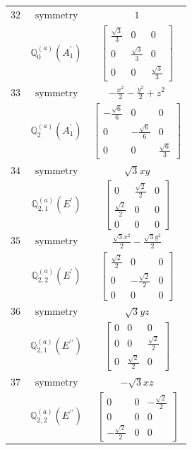 \documentclass[fleqn,8pt,landscape]{jsarticle}
\begin{document}
\begin{longtable}{ccc}
$ 32 $ & $ \text{symmetry} $ & $ 1 $ \\
$  $ & $ \mathbb{Q}_{0}^{(a)}(A_{1}^{\prime}) $ & $ \begin{bmatrix} \frac{\sqrt{3}}{3} & 0 & 0 \\ 0 & \frac{\sqrt{3}}{3} & 0 \\ 0 & 0 & \frac{\sqrt{3}}{3} \end{bmatrix} $ \\ \hline
$ 33 $ & $ \text{symmetry} $ & $ - \frac{x^{2}}{2} - \frac{y^{2}}{2} + z^{2} $ \\
$  $ & $ \mathbb{Q}_{2}^{(a)}(A_{1}^{\prime}) $ & $ \begin{bmatrix} - \frac{\sqrt{6}}{6} & 0 & 0 \\ 0 & - \frac{\sqrt{6}}{6} & 0 \\ 0 & 0 & \frac{\sqrt{6}}{3} \end{bmatrix} $ \\ \hline
$ 34 $ & $ \text{symmetry} $ & $ \sqrt{3} x y $ \\
$  $ & $ \mathbb{Q}_{2,1}^{(a)}(E^{\prime}) $ & $ \begin{bmatrix} 0 & \frac{\sqrt{2}}{2} & 0 \\ \frac{\sqrt{2}}{2} & 0 & 0 \\ 0 & 0 & 0 \end{bmatrix} $ \\ \hline
$ 35 $ & $ \text{symmetry} $ & $ \frac{\sqrt{3} x^{2}}{2} - \frac{\sqrt{3} y^{2}}{2} $ \\
$  $ & $ \mathbb{Q}_{2,2}^{(a)}(E^{\prime}) $ & $ \begin{bmatrix} \frac{\sqrt{2}}{2} & 0 & 0 \\ 0 & - \frac{\sqrt{2}}{2} & 0 \\ 0 & 0 & 0 \end{bmatrix} $ \\ \hline
$ 36 $ & $ \text{symmetry} $ & $ \sqrt{3} y z $ \\
$  $ & $ \mathbb{Q}_{2,1}^{(a)}(E^{\prime\prime}) $ & $ \begin{bmatrix} 0 & 0 & 0 \\ 0 & 0 & \frac{\sqrt{2}}{2} \\ 0 & \frac{\sqrt{2}}{2} & 0 \end{bmatrix} $ \\ \hline
$ 37 $ & $ \text{symmetry} $ & $ - \sqrt{3} x z $ \\
$  $ & $ \mathbb{Q}_{2,2}^{(a)}(E^{\prime\prime}) $ & $ \begin{bmatrix} 0 & 0 & - \frac{\sqrt{2}}{2} \\ 0 & 0 & 0 \\ - \frac{\sqrt{2}}{2} & 0 & 0 \end{bmatrix} $ \\ \hline

\end{longtable}
\end{document}
